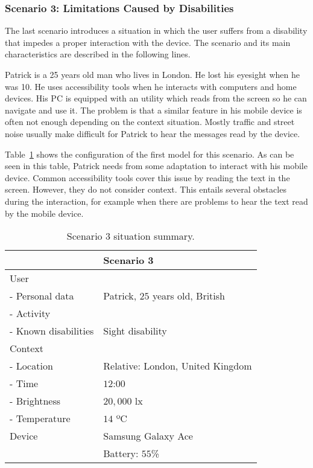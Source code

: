 \subsubsection{Scenario 3: Limitations Caused by Disabilities}
\label{sec:scenario3}

The last scenario introduces a situation in which the user suffers from a 
disability that impedes a proper interaction with the device. The scenario and 
its main characteristics are described in the following lines.

Patrick is a 25 years old man who lives in London. He lost his eyesight when he
was 10. He uses accessibility tools when he interacts with computers and home
devices. His PC is equipped with an utility which reads from the screen so he
can navigate and use it. The problem is that a similar feature in his mobile
device is often not enough depending on the context situation. Mostly traffic
and street noise usually make difficult for Patrick to hear the messages read by
the device.

Table~\ref{tbl:scenario3} shows the configuration of the first model for this
scenario. As can be seen in this table, Patrick needs from some adaptation to
interact with his mobile device. Common accessibility tools cover this issue by
reading the text in the screen. However, they do not consider context. This
entails several obstacles during the interaction, for example when there are
problems to hear the text read by the mobile device.

\begin{table}
 \caption{Scenario 3 situation summary.}
 \label{tbl:scenario3}
 \footnotesize
 \centering
\begin{tabular}{l l}
  \hline 
				& \textbf{Scenario 3}		\\
  \hline
  User \\
  \qquad - Personal data 	& Patrick, $25$ years old, British\\
  \qquad - Activity	 	& 				\\
  \qquad - Known disabilities 	& Sight disability		\\
  Context \\
  \qquad - Location 		& Relative: London, United Kingdom\\
  \qquad - Time			& $12$:$00$			\\
  \qquad - Brightness		& $20,000$ \ac{lx}		\\
  \qquad - Temperature		& $14$ ºC			\\
  Device 			& Samsung Galaxy Ace		\\
				&  Battery: $55$\%		\\	
  \hline
\end{tabular}
\end{table}

